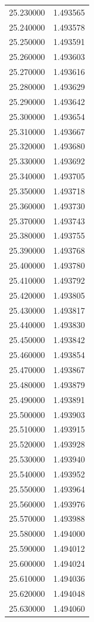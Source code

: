\begin{tabular}{rr}
25.230000 & 1.493565 \\
25.240000 & 1.493578 \\
25.250000 & 1.493591 \\
25.260000 & 1.493603 \\
25.270000 & 1.493616 \\
25.280000 & 1.493629 \\
25.290000 & 1.493642 \\
25.300000 & 1.493654 \\
25.310000 & 1.493667 \\
25.320000 & 1.493680 \\
25.330000 & 1.493692 \\
25.340000 & 1.493705 \\
25.350000 & 1.493718 \\
25.360000 & 1.493730 \\
25.370000 & 1.493743 \\
25.380000 & 1.493755 \\
25.390000 & 1.493768 \\
25.400000 & 1.493780 \\
25.410000 & 1.493792 \\
25.420000 & 1.493805 \\
25.430000 & 1.493817 \\
25.440000 & 1.493830 \\
25.450000 & 1.493842 \\
25.460000 & 1.493854 \\
25.470000 & 1.493867 \\
25.480000 & 1.493879 \\
25.490000 & 1.493891 \\
25.500000 & 1.493903 \\
25.510000 & 1.493915 \\
25.520000 & 1.493928 \\
25.530000 & 1.493940 \\
25.540000 & 1.493952 \\
25.550000 & 1.493964 \\
25.560000 & 1.493976 \\
25.570000 & 1.493988 \\
25.580000 & 1.494000 \\
25.590000 & 1.494012 \\
25.600000 & 1.494024 \\
25.610000 & 1.494036 \\
25.620000 & 1.494048 \\
25.630000 & 1.494060 \\

\end{tabular}
